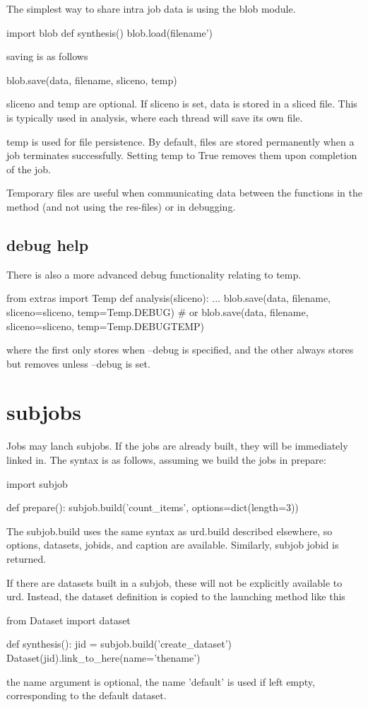 The simplest way to share intra job data is using the blob module.

\begin{python}
import blob
def synthesis()
  blob.load(filename')
\end{python}

saving is as follows

\begin{python}
  blob.save(data, filename, sliceno, temp)
\end{python}
sliceno and temp are optional.  If sliceno is set, data is stored in a
sliced file.  This is typically used in analysis, where each thread
will save its own file.

temp is used for file persistence.  By default, files are stored
permanently when a job terminates successfully.  Setting temp to True
removes them upon completion of the job.

Temporary files are useful when communicating data between the
functions in the method (and not using the res-files) or in debugging.


\subsection{debug help}
There is also a more advanced debug functionality relating to temp.

\begin{python}
from extras import Temp
def analysis(sliceno):
  ...
  blob.save(data, filename, sliceno=sliceno, temp=Temp.DEBUG)
  # or
  blob.save(data, filename, sliceno=sliceno, temp=Temp.DEBUGTEMP)
\end{python}
where the first only stores when --debug is specified, and the other
always stores but removes unless --debug is set.


\newpage
\section{subjobs}

Jobs may lanch subjobs.  If the jobs are already built, they will be
immediately linked in.  The syntax is as follows, assuming we build
the jobs in prepare:

\begin{python}
import subjob

def prepare():
  subjob.build('count_items', options=dict(length=3))
\end{python}
The subjob.build uses the same syntax as urd.build described
elsewhere, so options, datasets, jobids, and caption are available.
Similarly, subjob jobid is returned.

If there are datasets built in a subjob, these will not be explicitly
available to urd.  Instead, the dataset definition is copied to the
launching method like this

\begin{python}
from Dataset import dataset

def synthesis():
  jid = subjob.build('create_dataset')
  Dataset(jid).link_to_here(name='thename')
\end{python}
the name argument is optional, the name 'default' is used if left
empty, corresponding to the default dataset.
